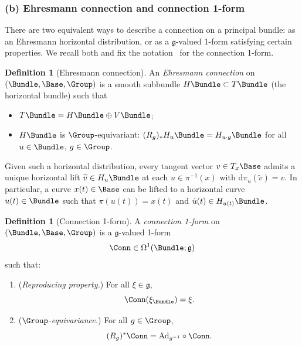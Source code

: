 \documentclass[11pt]{book}
\theoremstyle{plain}
\theoremstyle{definition}
\newtheorem{definition}[theorem]{Definition} \theoremstyle{remark}
\begin{document}
\subsubsection*{(b) Ehresmann connection and connection 1-form}

There are two equivalent ways to describe a connection on a principal
bundle: as an Ehresmann horizontal distribution, or as a
$\mathfrak{g}$-valued 1-form satisfying certain properties. We recall
both and fix the notation \Conn\ for the connection 1-form.



\begin{definition}[Ehresmann connection]
An \emph{Ehresmann connection} on $(\Bundle,\Base,\Group)$ is a
  smooth subbundle $H\Bundle\subset T\Bundle$ (the horizontal bundle)
  such that
  \begin{itemize}
    \item $T\Bundle = H\Bundle \oplus V\Bundle$;
    \item $H\Bundle$ is $\Group$-equivariant:
          $(R_g)_*H_u\Bundle = H_{u\cdot g}\Bundle$ for all $u\in\Bundle$,
          $g\in\Group$.
  \end{itemize}
\end{definition}

Given such a horizontal distribution, every tangent vector
$v\in T_x\Base$ admits a unique horizontal lift
$\widetilde{v}\in H_u\Bundle$ at each $u\in\pi^{-1}(x)$ with
$\mathrm{d}\pi_u(\widetilde{v})=v$. In particular, a curve
$x(t)\in\Base$ can be lifted to a horizontal curve $u(t)\in\Bundle$
such that $\pi(u(t))=x(t)$ and $\dot{u}(t)\in H_{u(t)}\Bundle$.



\begin{definition}[Connection 1-form]
A \emph{connection 1-form} on $(\Bundle,\Base,\Group)$ is a
  $\mathfrak{g}$-valued 1-form
  \[
     \Conn\in\Omega^1(\Bundle;\mathfrak{g})
  \]
  such that:
  \begin{enumerate}[label=\roman*)]
    \item (\emph{Reproducing property.})
          For all $\xi\in\mathfrak{g}$,
          \[
             \Conn(\xi_\Bundle)=\xi.
          \]
    \item (\emph{$\Group$-equivariance.})
          For all $g\in\Group$,
          \[
             (R_g)^*\Conn
             = \mathrm{Ad}_{g^{-1}}\circ\Conn.
          \]
  \end{enumerate}
\end{definition}
\end{document}
